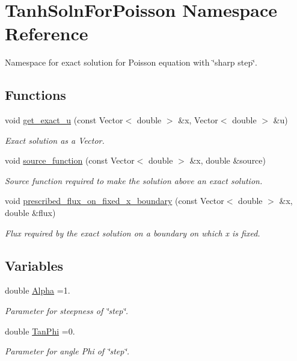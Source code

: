 \hypertarget{namespaceTanhSolnForPoisson}{}\section{Tanh\+Soln\+For\+Poisson Namespace Reference}
\label{namespaceTanhSolnForPoisson}


Namespace for exact solution for Poisson equation with \char`\"{}sharp step\char`\"{}.  


\subsection*{Functions}
\begin{DoxyCompactItemize}
\item 
void \hyperlink{namespaceTanhSolnForPoisson_af7896e9c18ce6438c73ae2a875e8b7de}{get\+\_\+exact\+\_\+u} (const Vector$<$ double $>$ \&x, Vector$<$ double $>$ \&u)
\begin{DoxyCompactList}\small\item\em Exact solution as a Vector. \end{DoxyCompactList}\item 
void \hyperlink{namespaceTanhSolnForPoisson_a967bc28320e02534beb714846b63e251}{source\+\_\+function} (const Vector$<$ double $>$ \&x, double \&source)
\begin{DoxyCompactList}\small\item\em Source function required to make the solution above an exact solution. \end{DoxyCompactList}\item 
void \hyperlink{namespaceTanhSolnForPoisson_a0e99ccf27df36f28f091de6d57484172}{prescribed\+\_\+flux\+\_\+on\+\_\+fixed\+\_\+x\+\_\+boundary} (const Vector$<$ double $>$ \&x, double \&flux)
\begin{DoxyCompactList}\small\item\em Flux required by the exact solution on a boundary on which x is fixed. \end{DoxyCompactList}\end{DoxyCompactItemize}
\subsection*{Variables}
\begin{DoxyCompactItemize}
\item 
double \hyperlink{namespaceTanhSolnForPoisson_ae676ccd186d5df119cce811596d949c1}{Alpha} =1.
\begin{DoxyCompactList}\small\item\em Parameter for steepness of \char`\"{}step\char`\"{}. \end{DoxyCompactList}\item 
double \hyperlink{namespaceTanhSolnForPoisson_a785ccd00a727125a5138fbbcac173294}{Tan\+Phi} =0.
\begin{DoxyCompactList}\small\item\em Parameter for angle Phi of \char`\"{}step\char`\"{}. \end{DoxyCompactList}\end{DoxyCompactItemize}


